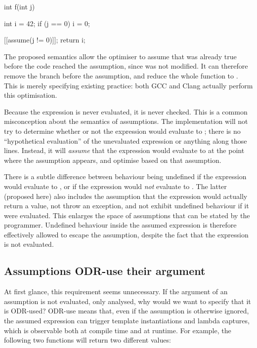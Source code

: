 \begin{codeblock}
int f(int j) {
  int i = 42;
  if (j == 0)
    i = 0;

  [[assume(j != 0)]];
  return i;
}
\end{codeblock}

The proposed semantics allow the optimiser to assume that  was already true before the code reached the assumption, since  was not modified. It can therefore remove the branch before the assumption, and reduce the whole function to . This is merely specifying existing practice: both GCC and Clang actually perform this optimisation.

Because the expression is never evaluated, it is never checked. This is a common misconception about the semantics of assumptions. The implementation will not try to determine whether or not the expression would evaluate to ; there is no ``hypothetical evaluation'' of the unevaluated expression or anything along those lines. Instead, it will \emph{assume} that the expression would evaluate to  at the point where the assumption appears, and optimise based on that assumption.

There is a subtle difference between behaviour being undefined if the expression would evaluate to , or if the expression would \emph{not} evaluate to . The latter (proposed here) also includes the assumption that the expression would actually return a value, not throw an exception, and not exhibit undefined behaviour if it were evaluated. This enlarges the space of assumptions that can be stated by the programmer. Undefined behaviour inside the assumed expression is therefore effectively allowed to escape the assumption, despite the fact that the expression is not evaluated.

\subsection{Assumptions ODR-use their argument}

At first glance, this requirement seems unnecessary. If the argument of an assumption is not evaluated, only analysed, why would we want to specify that it is ODR-used? ODR-use means that, even if the assumption is otherwise ignored, the assumed expression can trigger template instantiations and lambda captures, which is observable both at compile time and at runtime. For example, the following two functions will return two different values:

